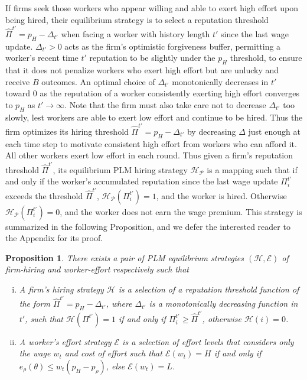 \documentclass[sigconf]{acmart}
\newtheorem{prop}{Proposition}
\theoremstyle{definition}
\begin{document}
If firms seek those workers who appear willing and able to exert high effort upon being hired, their equilibrium strategy is to select a reputation threshold $\hat{\Pi}^{t'} = p_H - \Delta_{t'}$ when facing a worker with history length $t'$ since the last wage update. $\Delta_{t'}>0$ acts as the firm's optimistic forgiveness buffer, permitting a worker's recent time $t'$ reputation to be slightly under the $p_H$ threshold, to ensure that it does not penalize workers who exert high effort but are unlucky and receive $B$ outcomes. An optimal choice of $\Delta_{t'}$ monotonically decreases in $t'$ toward $0$ as the reputation of a worker consistently exerting high effort converges to $p_H$ as $t' \rightarrow \infty$. Note that the firm must also take care not to decrease $\Delta_{t'}$ too slowly, lest workers are able to exert low effort and continue to be hired. Thus the firm optimizes its hiring threshold $\hat{\Pi}^{t'} = p_H - \Delta_{t'}$ by decreasing $\Delta$ just enough at each time step to motivate consistent high effort from workers who can afford it. All other workers exert low effort in each round. Thus given a firm's reputation threshold $\hat{\Pi}^{t'}$, its equilibrium PLM hiring strategy $\mathcal{H_P}$ is a mapping such that if and only if the worker's accumulated reputation since the last wage update $\Pi^{t'}_i$ exceeds the threshold $\hat{\Pi}^{t'}$, $\mathcal{H_P}(\Pi^{t'}_i) = 1$, and the worker is hired. Otherwise $\mathcal{H_P}(\Pi^{t'}_i) = 0$, and the worker does not earn the wage premium. This strategy is summarized in the following Proposition, and we defer the interested reader to the Appendix for its proof.

\begin{prop}
There exists a pair of PLM equilibrium strategies $(\mathcal{H}, \mathcal{E})$ of firm-hiring and worker-effort respectively such that 
\begin{enumerate}[(i)]
\item A firm's hiring strategy $\mathcal{H}$ is a selection of a reputation threshold function of the form $\hat{\Pi}^{t'} = p_H - \Delta_{t'}$, where $\Delta_{t'}$ is a monotonically decreasing function in ${t'}$, such that $\mathcal{H}(\Pi^{t'}) = 1$ if and only if $\Pi^{t'}_i \ge \hat{\Pi}^{t'}$, otherwise $\mathcal{H}(i) = 0$.
\item A worker's effort strategy $\mathcal{E}$ is a selection of effort levels that considers only the wage $w_t$ and cost of effort such that $\mathcal{E}(w_t) = H$ if and only if $e_\rho(\theta) \le w_t(p_H-p_\rho)$, else $\mathcal{E}(w_t) = L$. 
\end{enumerate}
\end{prop}
\end{document}
